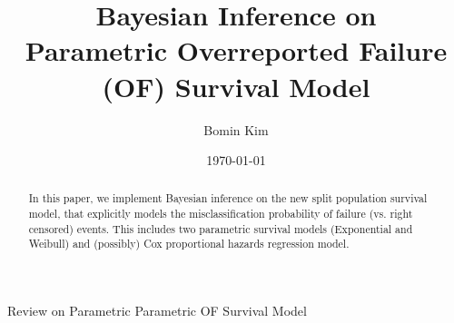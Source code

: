 \documentclass[a4paper, 12pt]{article}
\makeatletter
\renewcommand{\section}{\@startsection
	{section}    {1}    {0mm}    {-0.7\baselineskip}    {0.08\baselineskip}    {\normalfont\large\sc\center\bf}}
\makeatother
\begin{document}
\date{\today }
\title{Bayesian Inference on \\Parametric Overreported Failure (OF) Survival Model}
\author{Bomin Kim}
\maketitle
{}
\begin{abstract}
	\noindent In this paper, we implement Bayesian inference on the new split population survival model, that explicitly models the misclassification probability of failure (vs. right censored) events. This includes two parametric survival models (Exponential and Weibull) and (possibly) Cox proportional hazards regression model. 
\end{abstract}
\clearpage \pagebreak \renewcommand{\thefigure}{\arabic{figure}} %
\setcounter{figure}{0} \renewcommand{\thepage}{\arabic{page}} %
\setcounter{page}{1} \pagestyle{plain} \doublespacing
\section{Review on Parametric Parametric OF Survival Model}
\end{document}
